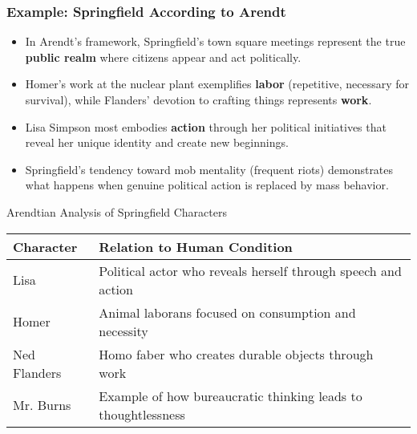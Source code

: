 \documentclass{beamer}
\begin{document}
\begin{frame}
    \frametitle{Example: Springfield According to Arendt}
    \begin{itemize}
        \item In Arendt's framework, Springfield's town square meetings represent the true \textbf{public realm} where citizens appear and act politically.
        \item Homer's work at the nuclear plant exemplifies \textbf{labor} (repetitive, necessary for survival), while Flanders' devotion to crafting things represents \textbf{work}.
        \item Lisa Simpson most embodies \textbf{action} through her political initiatives that reveal her unique identity and create new beginnings.
        \item Springfield's tendency toward mob mentality (frequent riots) demonstrates what happens when genuine political action is replaced by mass behavior.
    \end{itemize}
    
    \begin{exampleblock}{Arendtian Analysis of Springfield Characters}
        \scriptsize
    \begin{tabular}{lp{8cm}}
    \textbf{Character} & \textbf{Relation to Human Condition} \\
    \hline
    Lisa & Political actor who reveals herself through speech and action \\
    Homer & Animal laborans focused on consumption and necessity \\
    Ned Flanders & Homo faber who creates durable objects through work \\
    Mr. Burns & Example of how bureaucratic thinking leads to thoughtlessness \\
    \end{tabular}
    \end{exampleblock}
    \end{frame}
\end{document}
